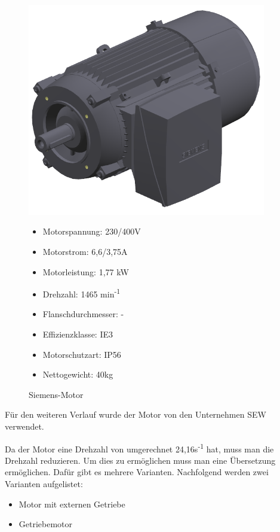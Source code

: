 \documentclass[12pt]{scrreprt} %
\begin{document}
\begin{figure}[!ht]
\begin{minipage}[t]{0.45\textwidth}
\includegraphics[width=0.93\textwidth]{SiemensMotor}
\caption{Siemens-Motor}

\begin{itemize}
	\item{Motorspannung: 230/400V}
	\item{Motorstrom: 6,6/3,75A}
	\item{Motorleistung: 1,77 kW}
	\item{Drehzahl: 1465 min\textsuperscript{-1}}
	\item{Flanschdurchmesser: -}
	\item{Effizienzklasse: IE3}
	\item{Motorschutzart: IP56}
	\item{Nettogewicht: 40kg}
\end{itemize}

\end{minipage}
\end{figure}

Für den weiteren Verlauf wurde der Motor von den Unternehmen SEW verwendet.

Da der Motor eine Drehzahl von umgerechnet 24,16s\textsuperscript{-1} hat, muss man die Drehzahl reduzieren. Um dies zu ermöglichen muss man eine Übersetzung ermöglichen. Dafür gibt es mehrere Varianten. Nachfolgend werden zwei Varianten aufgelistet:

\begin{itemize}
	\item{Motor mit externen Getriebe}
	\item{Getriebemotor}
\end{itemize}
\end{document}
